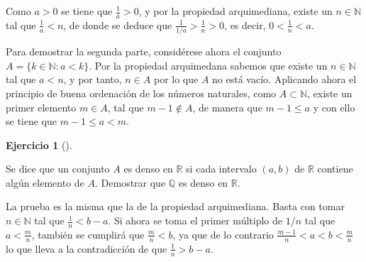 \documentclass[
  spanish,
  a4paper,
]{scrreport}
\theoremstyle{definition}
\newtheorem{exercise}{Ejercicio}[chapter]
\theoremstyle{remark}
\begin{document}
\begin{tcolorbox}[enhanced jigsaw, arc=.35mm, bottomrule=.15mm, bottomtitle=1mm, breakable, colback=white, colbacktitle=quarto-callout-tip-color!10!white, colframe=quarto-callout-tip-color-frame, coltitle=black, left=2mm, leftrule=.75mm, opacityback=0, opacitybacktitle=0.6, rightrule=.15mm, title=\textcolor{quarto-callout-tip-color}{\faLightbulb}\hspace{0.5em}{Solución}, titlerule=0mm, toprule=.15mm, toptitle=1mm]

Como \(a>0\) se tiene que \(\frac{1}{a}>0\), y por la propiedad
arquimediana, existe un \(n\in\mathbb{N}\) tal que \(\frac{1}{a}<n\), de
donde se deduce que \(\frac{1}{1/a}>\frac{1}{n}>0\), es decir,
\(0<\frac{1}{n}<a\).

Para demostrar la segunda parte, considérese ahora el conjunto
\(A=\{k\in \mathbb{N}: a<k\}\). Por la propiedad arquimedana sabemos que
existe un \(n\in \mathbb{N}\) tal que \(a<n\), y por tanto, \(n\in A\)
por lo que \(A\) no está vacío. Aplicando ahora el principio de buena
ordenación de los números naturales, como \(A\subset \mathbb{N}\),
existe un primer elemento \(m\in A\), tal que \(m-1\not\in A\), de
manera que \(m-1\leq a\) y con ello se tiene que \(m-1\leq a<m\).

\end{tcolorbox}

\begin{exercise}[]\protect\hypertarget{exr-densidad-racionales}{}\label{exr-densidad-racionales}

Se dice que un conjunto \(A\) es denso en \(\mathbb{R}\) si cada
intervalo \((a,b)\) de \(\mathbb{R}\) contiene algún elemento de \(A\).
Demostrar que \(\mathbb{Q}\) es denso en \(\mathbb{R}\).

\end{exercise}

\begin{tcolorbox}[enhanced jigsaw, arc=.35mm, bottomrule=.15mm, bottomtitle=1mm, breakable, colback=white, colbacktitle=quarto-callout-tip-color!10!white, colframe=quarto-callout-tip-color-frame, coltitle=black, left=2mm, leftrule=.75mm, opacityback=0, opacitybacktitle=0.6, rightrule=.15mm, title=\textcolor{quarto-callout-tip-color}{\faLightbulb}\hspace{0.5em}{Solución}, titlerule=0mm, toprule=.15mm, toptitle=1mm]

La prueba es la misma que la de la propiedad arquimediana. Basta con
tomar \(n\in \mathbb{N}\) tal que \(\frac{1}{n}< b-a\). Si ahora se toma
el primer múltiplo de \(1/n\) tal que \(a<\frac{m}{n}\), también se
cumplirá que \(\frac{m}{n}<b\), ya que de lo contrario
\(\frac{m-1}{n}<a<b<\frac{m}{n}\) lo que lleva a la contradicción de que
\(\frac{1}{n}>b-a\).

\end{tcolorbox}
\end{document}
